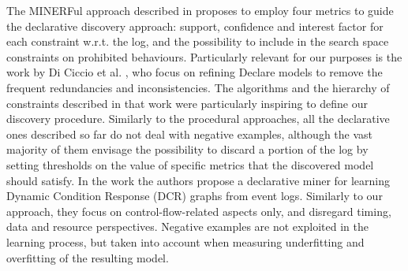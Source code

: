 The MINERFul approach described in \cite{2015-DiCiccio} proposes to employ four metrics to guide the declarative discovery approach: support, confidence and interest factor for each constraint w.r.t. the log, and the possibility to include in the search space constraints on prohibited behaviours.
Particularly relevant for our purposes is the work by Di Ciccio et al. \cite{2017-DiCiccio}, who focus on refining Declare models to remove the frequent redundancies and inconsistencies. The algorithms and the hierarchy of constraints described in that work were particularly inspiring to define our discovery procedure.
Similarly to the procedural approaches, all the declarative ones described so far do not deal with negative examples, although the vast majority of them envisage the possibility to discard a portion of the log by setting thresholds on the value of specific metrics that the discovered model should satisfy.
In the work \cite{2021-Back}  the authors propose a declarative miner for learning Dynamic Condition Response (DCR) graphs from event logs. Similarly to our approach, they focus on control-flow-related aspects only, and disregard timing, data and resource perspectives. Negative examples are not exploited in the learning process, but taken into account when measuring underfitting and overfitting of the resulting model.


